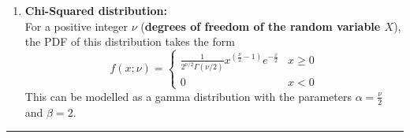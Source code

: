 \documentclass[a4paper]{article}
\begin{document}
\begin{itemize}
\begin{enumerate}
    \item \textbf{Chi-Squared distribution:}\\
    For a positive integer $\nu$ (\textbf{degrees of freedom of the random variable $X$}), the PDF of this distribution takes the form
    \begin{equation*}
        f(x; \nu) = \begin{cases}
        \frac{1}{2^{\nu/2}\Gamma(\nu/2)}x^{\left(\frac{\nu}{2}-1\right)}e^{-\frac{x}{2}} & x\geq 0\\
        0 & x < 0
        \end{cases}
    \end{equation*}
        This can be modelled as a gamma distribution with the parameters $\alpha = \frac{\nu}{2}$ and $\beta = 2$.
    \end{enumerate}
     \par\noindent\rule{\textwidth}{0.4pt}
\end{itemize}
\end{document}
